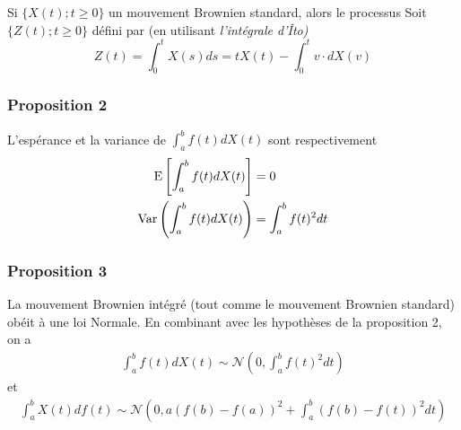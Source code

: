 \documentclass[10pt, french, landscape]{article}
\begin{document}
\begin{multicols*}{2}
\begin{definition}
Si $\{X(t) ; t \geq 0 \}$ un mouvement Brownien standard, alors le processus Soit $\{Z(t) ; t \geq 0 \}$ défini par (en utilisant \emph{l'intégrale d'Îto)}
\[Z(t) = \int_{0}^{t} X(s) ds = t X(t) - \int_{0}^{t} v \cdot  d X(v) \]
\end{definition}


\subsubsection*{Proposition 2}
L'espérance et la variance de $\int_{a}^{b} f(t) d X(t) $ sont respectivement
\begin{align*}
\mathrm{E} \left[ \int_{a}^{b} f(t) d X(t)  \right] & = 0 \\
\mathrm{Var} \left( \int_{a}^{b} f(t) d X(t)   \right) & =  \int_{a}^{b} f(t)^2 dt \\
\end{align*}


\subsubsection*{Proposition 3}
La mouvement Brownien intégré (tout comme le mouvement Brownien standard) obéit à une loi Normale. En combinant avec les hypothèses de la proposition 2, on a
\begin{align*}
\int_{a}^{b} f(t) d X(t) \sim \mathcal{N} \left( 0 , \int_{a}^{b} f(t)^2 dt \right)
\end{align*}
et
\begin{align*}
\int_{a}^{b} X(t) d f(t) \sim \mathcal{N} \left( 0, a\left(f(b) - f(a)\right)^2 + \int_{a}^{b} \left( f(b) - f(t) \right)^2 dt \right)
\end{align*}





\end{multicols*}

\end{document}
